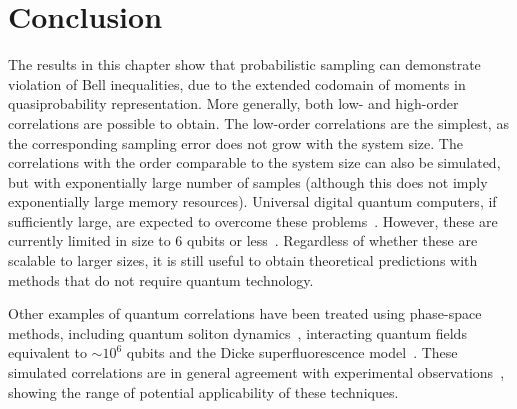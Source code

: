 \section{Conclusion}

The results in this chapter show that probabilistic sampling can demonstrate violation of Bell inequalities, due to the extended codomain of moments in quasiprobability representation.
More generally, both low- and high-order correlations are possible to obtain.
The low-order correlations are the simplest, as the corresponding sampling error does not grow with the system size.
The correlations with the order comparable to the system size can also be simulated, but with exponentially large number of samples (although this does not imply exponentially large memory resources).
Universal digital quantum computers, if sufficiently large, are expected to overcome these problems~\cite{Lloyd1996}.
However, these are currently limited in size to 6 qubits or less~\cite{Lanyon2011}.
Regardless of whether these are scalable to larger sizes, it is still useful to obtain theoretical predictions with methods that do not require quantum technology.

Other examples of quantum correlations have been treated using phase-space methods, including quantum soliton dynamics~\cite{Drummond1993a}, interacting quantum fields~\cite{Deuar2007} equivalent to $\sim10^{6}$ qubits and the Dicke superfluorescence model~\cite{Altland2012}.
These simulated correlations are in general agreement with experimental observations~\cite{Jaskula2010}, showing the range of potential applicability of these techniques.
